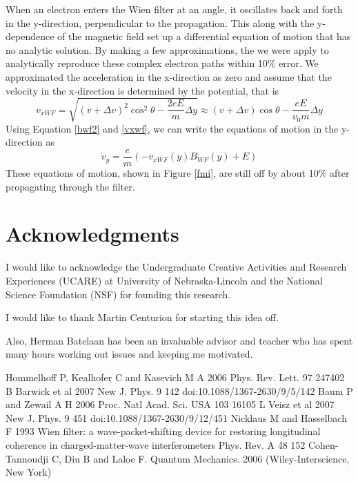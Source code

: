 \documentclass[12pt,letterpaper]{article}
\newcommand{\eqqref}[1]{Equation \ref{#1}}
\newcommand{\dv}{\Delta v}
\newcommand{\dy}{\Delta y}
\begin{document}
When an electron enters the Wien filter at an angle, it oscillates back and forth in the y-direction, perpendicular to the propagation.
This along with the y-dependence of the magnetic field set up a differential equation of motion that has no analytic solution. 
By making a few approximations, the we were apply to analytically reproduce these complex electron paths within 10\% error. 
We approximated the acceleration in the x-direction as zero and assume that the velocity in the x-direction is determined by the potential, that is
\begin{equation}
   v_{xWF} = \sqrt{(v+\dv)^2 \cos^2 \theta - \frac{2eE}{m} \dy} \approx (v+\dv) \cos \theta -\frac{eE}{v_0 m} \dy
   \label{vxwf}
\end{equation}
Using \eqqref{bwf2} and \ref{vxwf}, we can write the equations of motion in the y-direction as
\begin{equation}
   \dot{v}_y=\frac{e}{m}\left( -v_{xWF}(y) B_{WF}(y) +E \right)
   \label{motion}
\end{equation}
These equations of motion, shown in Figure \ref{fmi}, are still off by about 10\% after propagating through the filter.

\section{Acknowledgments}
I would like to acknowledge the Undergraduate Creative Activities and Research Experiences (UCARE) at University of Nebraska-Lincoln and the National Science Foundation (NSF) for founding this research.

I would like to thank Martin Centurion for starting this idea off. 

Also, Herman Batelaan has been an invaluable advisor and teacher who has spent many hours working out issues and keeping me motivated. 



\pagebreak
\begin{thebibliography}{9}
      Hommelhoff P, Kealhofer C and Kasevich M A 2006 Phys. Rev. Lett. 97 247402 
      B Barwick et al 2007 New J. Phys. 9 142 doi:10.1088/1367-2630/9/5/142
      Baum P and Zewail A H 2006 Proc. Natl Acad. Sci. USA 103 16105
      L Veisz et al 2007 New J. Phys. 9 451 doi:10.1088/1367-2630/9/12/451
      Nicklaus M and Hasselbach F 1993 Wien filter: a wave-packet-shifting device for restoring longitudinal coherence in charged-matter-wave interferometers Phys. Rev. A 48 152
      Cohen-Tannoudji C, Diu B and Laloe F. Quantum Mechanics. 2006 (Wiley-Interscience, New York) 
\end{thebibliography}
\end{document}
